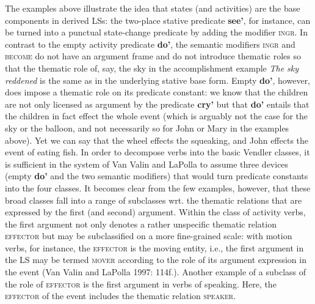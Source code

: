 The examples above illustrate the idea that states (and activities) are the base components in derived LSs: the two-place stative predicate \textbf{see'}, for instance, can be turned into a punctual state-change predicate by adding the modifier \textsc{ingr}. In contrast to the empty activity predicate \textbf{do'}, the semantic modifiers \textsc{ingr} and \textsc{become} do not have an argument frame and do not introduce thematic roles so that the thematic role of, say, the sky in the accomplishment example \textit{The sky reddened} is the same as in the underlying stative base form. Empty \textbf{do'}, however, does impose a thematic role on its predicate constant: we know that the children are not only licensed as argument by the predicate \textbf{cry'} but that \textbf{do'} entails that the children in fact effect the whole event (which is arguably not the case for the sky or the balloon, and not necessarily so for John or Mary in the examples above). Yet we can say that the wheel effects the squeaking, and John effects the event of eating fish. In order to decompose verbs into the basic Vendler classes, it is sufficient in the system of Van Valin and LaPolla to assume three devices (empty \textbf{do'} and the two semantic modifiers) that would turn predicate constants into the four classes. It becomes clear from the few examples, however, that these broad classes fall into a range of subclasses wrt. the thematic relations that are expressed by the first (and second) argument. Within the class of activity verbs, the first argument not only denotes a rather unspecific thematic relation \textsc{effector} but may be subclassified on a more fine-grained scale: with motion verbs, for instance, the \textsc{effector} is the moving entity, i.e., the first argument in the LS may be termed \textsc{mover} according to the role of its argument expression in the event (Van Valin and LaPolla 1997: 114f.). Another example of a subclass of the role of \textsc{effector} is the first argument in verbs of speaking. Here, the \textsc{effector} of the event includes the thematic relation \textsc{speaker}. 

